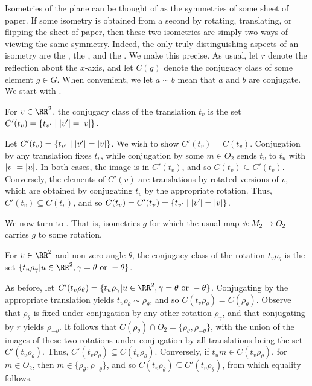 \documentclass{scrartcl}
\begin{document}


\begin{solution}
        Isometries of the plane can be thought of as the symmetries of some sheet of paper. If some isometry is obtained from a second by rotating, translating, or flipping the sheet of paper, then these two isometries are simply two ways of viewing the same symmetry. Indeed, the only truly distinguishing aspects of an isometry are the , the , and the . We make this precise. As usual, let $r$ denote the reflection about the $x$-axis, and let $C(g)$ denote the conjugacy class of some element $g\in G$. When convenient, we let $a\sim b$ mean that $a$ and $b$ are conjugate. We start with .
        \begin{lemma}
        For $v\in \RR^2$, the conjugacy class of the translation $t_v$ is the set $C'(t_v)=\{t_{v'}\mid \lvert v'\rvert=\lvert v\rvert\}$.
        \end{lemma}
        \begin{subproof}
        Let $C'(t_v)=\{t_{v'}\mid \lvert v'\rvert=\lvert v\rvert\}$. We wish to show $C'(t_v)=C(t_v)$. Conjugation by any translation fixes $t_v$, while conjugation by some $m\in O_2$ sends $t_v$ to $t_u$ with $\lvert v\rvert=\lvert u\rvert$. In both cases, the image is in $C'(t_v)$, and so $C(t_v)\subseteq C'(t_v)$. Conversely, the elements of $C'(v)$ are translations by rotated versions of $v$, which are obtained by conjugating $t_v$ by the appropriate rotation. Thus, $C'(t_v)\subseteq C(t_v)$, and so $C(t_v)=C'(t_v)=\{t_{v'}\mid \lvert v'\rvert=\lvert v\rvert\}$.
        \end{subproof}
    
        We now turn to . That is, isometries $g$ for which the usual map $\phi: M_2 \to O_2$ carries $g$ to some rotation.
        \begin{lemma}
        For $v\in \RR^2$ and non-zero angle $\theta$, the conjugacy class of the rotation $t_v\rho_\theta$ is the set $\{t_u\rho_\gamma| u\in \RR^2, \gamma=\theta \text{ or } -\theta\}$.
        \end{lemma}
        \begin{subproof} As before, let $C'(t_v\rho_\theta)=\{t_u\rho_\gamma| u\in \RR^2, \gamma=\theta \text{ or } -\theta\}$. Conjugating by the appropriate translation yields $t_v\rho_\theta\sim \rho_\theta$, and so $C(t_v\rho_\theta)=C(\rho_\theta)$. Observe that $\rho_\theta$ is fixed under conjugation by any other rotation $\rho_\gamma$, and that conjugating by $r$ yields $\rho_{-\theta}$. It follows that $C(\rho_\theta)\cap O_2=\{\rho_{\theta},\rho_{-\theta}\}$, with the union of the images of these two rotations under conjugation by all translations being the set $C'(t_v\rho_\theta)$. Thus, $C'(t_v\rho_\theta)\subseteq C(t_v\rho_\theta)$. Conversely, if $t_um\in C(t_v\rho_\theta)$, for $m\in O_2$, then $m\in \{\rho_{\theta},\rho_{-\theta}\}$, and so $C(t_v\rho_\theta)\subseteq C'(t_v\rho_\theta)$, from which equality follows.
        \end{subproof}
    

\end{solution}
\end{document}
